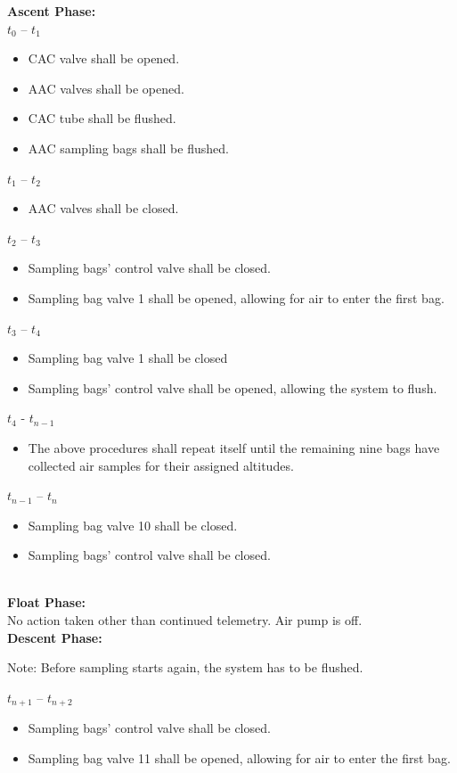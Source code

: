 \textbf{Ascent Phase:}\\
$t_0$ – $t_1$
\begin{itemize}
    \item CAC valve shall be opened.
    \item AAC valves shall be opened.
    \item CAC tube shall be flushed.
    \item AAC sampling bags shall be flushed.
    \end{itemize}
$t_1$ – $t_2$
\begin{itemize}
    \item AAC valves shall be closed.
    \end{itemize}
$t_2$ – $t_3$
\begin{itemize}
    \item Sampling bags' control valve shall be closed.
    \item Sampling bag valve 1 shall be opened, allowing for air to enter the first bag.
    \end{itemize}
$t_3$ – $t_4$
\begin{itemize}
    \item Sampling bag valve 1 shall be closed
    \item Sampling bags' control valve shall be opened, allowing the system to flush. 
    \end{itemize}
$t_4$ - $t_{n-1}$
\begin{itemize}
    \item The above procedures shall repeat itself until the remaining nine bags have collected air samples for their assigned altitudes.
    \end{itemize}
$t_{n-1}$ – $t_n$
\begin{itemize}
    \item Sampling bag valve 10 shall be closed.
    \item Sampling bags' control valve shall be closed.
\end{itemize}


\textbf{\\Float Phase:}\\
No action taken other than continued telemetry. Air pump is off.\\
 
\textbf{Descent Phase:}

Note: Before sampling starts again, the system has to be flushed. 

$t_{n+1}$ – $t_{n+2}$
\begin{itemize}
    \item Sampling bags' control valve shall be closed.
    \item Sampling bag valve 11 shall be opened, allowing for air to enter the first bag.
\end{itemize}

